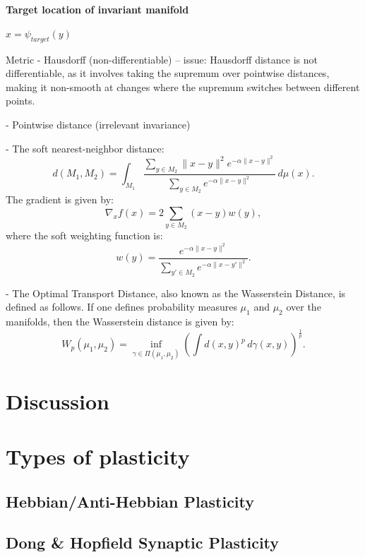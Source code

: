 \documentclass{article}
\theoremstyle{definition} \newtheorem{definition}{Definition}
\theoremstyle{remark} \newtheorem{remark}{Remark}
\newcounter{ct}
\begin{document}
\paragraph{Target location of invariant manifold}
$x = \psi_{target}(y)$

Metric
- Hausdorff (non-differentiable)
-- issue: Hausdorff distance is not differentiable, as it involves taking the supremum over pointwise distances, making it non-smooth at changes where the supremum switches between different points.


- Pointwise distance (irrelevant invariance)

- The soft nearest-neighbor distance:
\[
d(M_1, M_2) = \int_{M_1} \frac{\sum\limits_{y \in M_2} \|x - y\|^2 e^{-\alpha \|x - y\|^2}}{\sum\limits_{y \in M_2} e^{-\alpha \|x - y\|^2}} \, d\mu(x).
\]
The gradient is given by:
\[
\nabla_x f(x) = 2 \sum_{y \in M_2} (x - y) w(y),
\]
where the soft weighting function is:
\[
w(y) = \frac{e^{-\alpha \|x - y\|^2}}{\sum\limits_{y' \in M_2} e^{-\alpha \|x - y'\|^2}}.
\]


- The Optimal Transport Distance, also known as the Wasserstein Distance, is defined as follows.
If one defines probability measures \( \mu_1 \) and \( \mu_2 \) over the manifolds, then the Wasserstein distance is given by:
\[
W_p(\mu_1, \mu_2) = \inf_{\gamma \in \Pi(\mu_1, \mu_2)} \left( \int d(x, y)^p \, d\gamma(x, y) \right)^{\frac{1}{p}}.
\]





\section{Discussion}




\newpage
%




\newpage
\appendix

\section{Types of plasticity}
\subsection{Hebbian/Anti-Hebbian Plasticity}
\subsection{Dong \& Hopfield Synaptic Plasticity}
\end{document}
